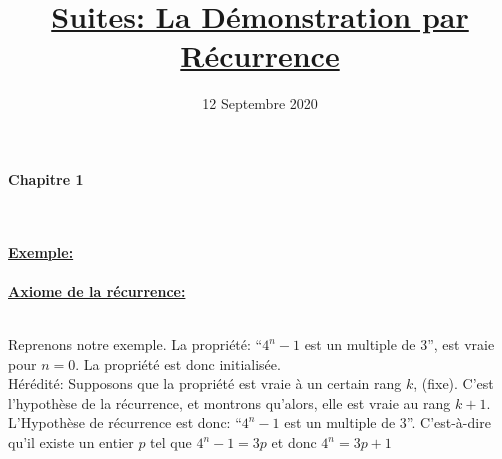 \documentclass[12pt, a4paper]{article}
\makeatletter
\renewcommand\maketitle{
{\raggedright
{\large \bfseries Chapitre 1}\\[4ex]
{\Large \bfseries \@title}\\[4ex]
\@date \\[8ex]}}
\makeatother
\begin{document}
    \title{\underline{Suites: La Démonstration par Récurrence}}
    \date{ 12 Septembre 2020}
    \maketitle

    \textbf{\underline{Exemple:}}\\[2ex]
     \\[4ex]
    \indent \textbf{\underline{Axiome de la récurrence:}}\\[2ex]
    \\[4ex]
    {\indent\parbox[t]{\dimexpr\linewidth-\parindent}{
        Reprenons notre exemple. La propriété: ``$4^n-1$ est un multiple de 3'', est vraie pour $n=0$. La propriété est donc initialisée.\\[2ex]
        Hérédité: Supposons que la propriété est vraie à un certain rang $k$, (fixe). C'est l'hypothèse de la récurrence, et montrons qu'alors, elle est vraie au rang $k+1$.\\[2ex]
        L'Hypothèse de récurrence est donc: ``$4^n-1$ est un multiple de 3''. C'est-à-dire qu'il existe un entier $p$ tel que $4^n-1=3p$ et donc $4^n=3p+1$ \pagebreak
    }}
\end{document}
